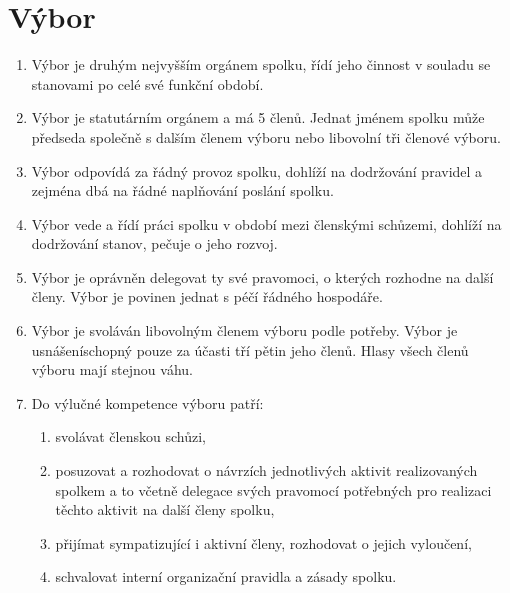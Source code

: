 \documentclass[11pt,a4paper]{article}
\begin{document}
\section{Výbor}
\begin{enumerate}[itemsep=0pt]
    \item Výbor je druhým nejvyšším orgánem spolku, řídí jeho činnost v souladu 
    se stanovami po celé své funkční období. 
    \item Výbor je statutárním orgánem a má 5 členů. Jednat jménem spolku může 
    předseda společně s dalším členem výboru nebo libovolní tři členové výboru.
    \item Výbor odpovídá za řádný provoz spolku, dohlíží na dodržování pravidel 
    a zejména dbá na řádné naplňování poslání spolku.
    \item Výbor vede a řídí práci spolku v období mezi členskými schůzemi, 
    dohlíží na dodržování stanov, pečuje o jeho rozvoj.
    \item Výbor je oprávněn delegovat ty své pravomoci, o kterých rozhodne na 
    další členy. Výbor je povinen jednat s péčí řádného hospodáře. 
    \item Výbor je svoláván libovolným členem výboru podle potřeby. Výbor je 
    usnášeníschopný pouze za účasti tří pětin jeho členů. Hlasy všech členů 
    výboru mají stejnou váhu.
    \item Do výlučné kompetence výboru patří: 
    \begin{enumerate}[itemsep=0pt,topsep=0pt]
        \item svolávat členskou schůzi, 
        \item posuzovat a rozhodovat o návrzích jednotlivých aktivit 
        realizovaných spolkem a to včetně delegace svých pravomocí potřebných 
        pro realizaci těchto aktivit na další členy spolku,
        \item přijímat sympatizující i aktivní členy, rozhodovat o jejich 
        vyloučení,
        \item schvalovat interní organizační pravidla a zásady spolku.
    \end{enumerate}
\end{enumerate}
\end{document}
